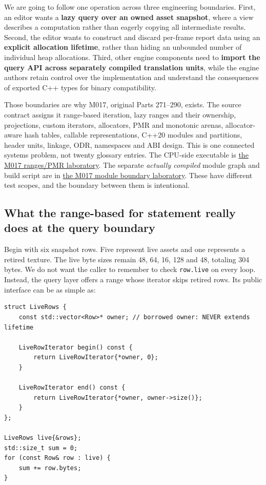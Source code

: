 We are going to follow one operation across three engineering boundaries. First, an editor wants a \textbf{lazy query over an owned asset snapshot}, where a view describes a computation rather than eagerly copying all intermediate results. Second, the editor wants to construct and discard per-frame report data using an \textbf{explicit allocation lifetime}, rather than hiding an unbounded number of individual heap allocations. Third, other engine components need to \textbf{import the query API across separately compiled translation units}, while the engine authors retain control over the implementation and understand the consequences of exported C++ types for binary compatibility.

Those boundaries are why M017, original Parts 271--290, exists. The source contract assigns it range-based iteration, lazy ranges and their ownership, projections, custom iterators, allocators, PMR and monotonic arenas, allocator-aware hash tables, callable representations, C++20 modules and partitions, header units, linkage, ODR, namespaces and ABI design. This is one connected systems problem, not twenty glossary entries. The CPU-side executable is \hyperref[source-file-a1c76c44bc377537c732f5c4]{the M017 ranges/PMR laboratory}. The separate \emph{actually compiled} module graph and build script are in \hyperref[source-file-e1b7c3e4f52da0e7c9c36a41]{the M017 module boundary laboratory}. These have different test scopes, and the boundary between them is intentional.

\subsection{What the range-based for statement really does at the query boundary}\label{05-engine-i-ch006-what-the-range-based-for-statement-really-does-at-the-query-boundary}

Begin with six snapshot rows. Five represent live assets and one represents a retired texture. The live byte sizes remain 48, 64, 16, 128 and 48, totaling 304 bytes. We do not want the caller to remember to check \texttt{row.live} on every loop. Instead, the query layer offers a range whose iterator skips retired rows. Its public interface can be as simple as:

\begin{verbatim}
struct LiveRows {
    const std::vector<Row>* owner; // borrowed owner: NEVER extends lifetime

    LiveRowIterator begin() const {
        return LiveRowIterator{*owner, 0};
    }

    LiveRowIterator end() const {
        return LiveRowIterator{*owner, owner->size()};
    }
};

LiveRows live{&rows};
std::size_t sum = 0;
for (const Row& row : live) {
    sum += row.bytes;
}
\end{verbatim}

